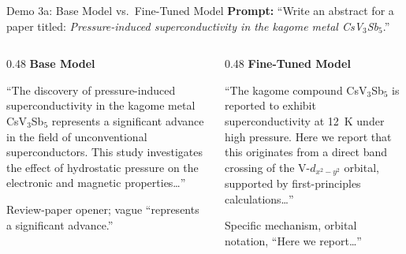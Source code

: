 \documentclass[aspectratio=169]{beamer}
\begin{document}
\begin{frame}{Demo 3a: Base Model vs.\ Fine-Tuned Model}
    \textbf{Prompt:} ``Write an abstract for a paper titled: \emph{Pressure-induced superconductivity in the kagome metal CsV$_3$Sb$_5$}.''

    \vspace{0.4em}
    \begin{columns}[T]
        \begin{column}{0.48\textwidth}
            \textbf{Base Model}
            \begin{tcolorbox}[colback=gray!10, colframe=gray!40, boxrule=0.5pt, arc=2pt, fontupper=\footnotesize]
                ``The discovery of pressure-induced superconductivity in the kagome metal CsV$_3$Sb$_5$ represents a significant advance in the field of unconventional superconductors. This study investigates the effect of hydrostatic pressure on the electronic and magnetic properties\ldots''
            \end{tcolorbox}
            {\footnotesize\color{red} Review-paper opener; vague ``represents a significant advance.''}
        \end{column}
        \begin{column}{0.48\textwidth}
            \textbf{Fine-Tuned Model}
            \begin{tcolorbox}[colback=blue!5, colframe=blue!30, boxrule=0.5pt, arc=2pt, fontupper=\footnotesize]
                ``The kagome compound CsV$_3$Sb$_5$ is reported to exhibit superconductivity at 12~K under high pressure. Here we report that this originates from a direct band crossing of the V-$d_{x^2-y^2}$ orbital, supported by first-principles calculations\ldots''
            \end{tcolorbox}
            {\footnotesize\color{green!50!black} Specific mechanism, orbital notation, ``Here we report\ldots''}
        \end{column}
    \end{columns}
\end{frame}
\end{document}
